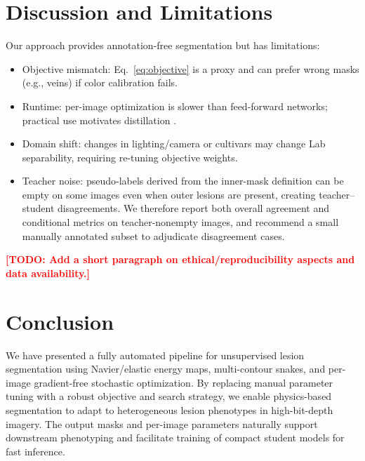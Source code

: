 \documentclass[journal]{IEEEtran}
\newcommand{\TODO}[1]{\textcolor{red}{\textbf{[TODO: #1]}}}
\begin{document}
\section{Discussion and Limitations}
Our approach provides annotation-free segmentation but has limitations:
\begin{itemize}
    \item Objective mismatch: Eq.~\eqref{eq:objective} is a proxy and can prefer wrong masks (e.g., veins) if color calibration fails.
    \item Runtime: per-image optimization is slower than feed-forward networks; practical use motivates distillation \cite{hinton2015distilling}.
    \item Domain shift: changes in lighting/camera or cultivars may change Lab separability, requiring re-tuning objective weights.
    \item Teacher noise: pseudo-labels derived from the inner-mask definition can be empty on some images even when outer lesions are present, creating teacher--student disagreements. We therefore report both overall agreement and conditional metrics on teacher-nonempty images, and recommend a small manually annotated subset to adjudicate disagreement cases.
\end{itemize}
\TODO{Add a short paragraph on ethical/reproducibility aspects and data availability.}

\section{Conclusion}
We have presented a fully automated pipeline for unsupervised lesion segmentation using Navier/elastic energy maps, multi-contour snakes, and per-image gradient-free stochastic optimization. By replacing manual parameter tuning with a robust objective and search strategy, we enable physics-based segmentation to adapt to heterogeneous lesion phenotypes in high-bit-depth imagery. The output masks and per-image parameters naturally support downstream phenotyping and facilitate training of compact student models for fast inference.



\end{document}
